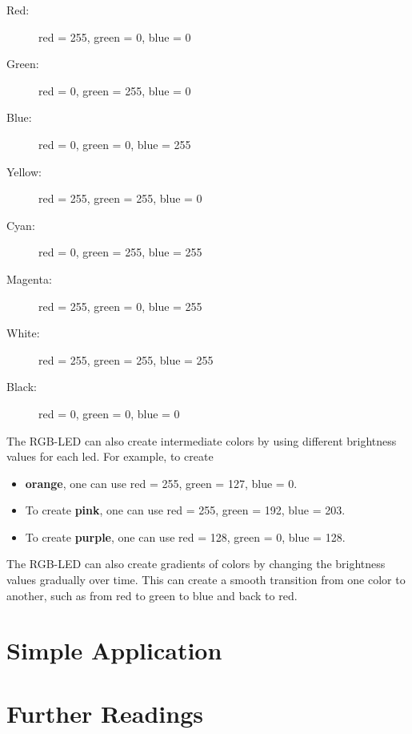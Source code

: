         \begin{description}
            \item [Red:] red = 255, green = 0, blue = 0
            \item [Green:] red = 0, green = 255, blue = 0
            \item [Blue:] red = 0, green = 0, blue = 255
            \item [Yellow:] red = 255, green = 255, blue = 0
            \item [Cyan:] red = 0, green = 255, blue = 255
            \item [Magenta:] red = 255, green = 0, blue = 255
            \item [White:] red = 255, green = 255, blue = 255
            \item [Black:] red = 0, green = 0, blue = 0
        \end{description}
        
        \medskip
        
        The RGB-LED can also create intermediate colors by using different brightness values for each \ac{led}. For example, to create
        
        \begin{itemize}
            \item \textbf{orange}, one can use red = 255, green = 127, blue = 0. 
            \item To create \textbf{pink}, one can use red = 255, green = 192, blue = 203. 
            \item To create \textbf{purple}, one can use red = 128, green = 0, blue = 128. 
        \end{itemize}
        
        \medskip
        
        The RGB-LED can also create gradients of colors by changing the brightness values gradually over time. This can create a smooth transition from one color to another, such as from red to green to blue and back to red.


\section{Simple Application}


\section{Further Readings}


